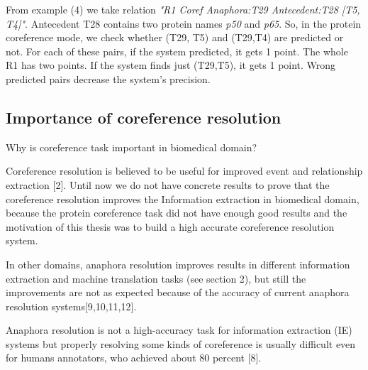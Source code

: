 From example (4) we take relation \emph{"R1 Coref Anaphora:T29 Antecedent:T28 [T5, T4]"}. Antecedent T28 contains two protein names \emph{p50} and \emph{p65}. So, in the protein coreference mode, we check whether (T29, T5) and (T29,T4) are predicted or not. For each of these pairs, if the system predicted, it gets 1 point. The whole R1 has two points. If the system finds just (T29,T5), it gets 1 point. Wrong predicted pairs decrease the system's precision. 

\subsection{Importance of coreference resolution}

Why is coreference task important in biomedical domain?

Coreference resolution is believed to be useful for improved event and relationship extraction [2]. Until now we do not have concrete results to prove that the coreference resolution improves the Information extraction in biomedical domain, because the protein coreference task did not have enough good results and the motivation of this thesis was to build a high accurate coreference resolution system.
 
In other domains, anaphora resolution improves results in different information extraction and machine translation tasks (see section 2), but still the improvements are not as expected because of the accuracy of current anaphora resolution systems[9,10,11,12].
 
Anaphora resolution is not a high-accuracy task for information extraction (IE) systems but properly resolving some kinds of coreference is usually difficult even for humans annotators, who achieved about 80 percent [8].


